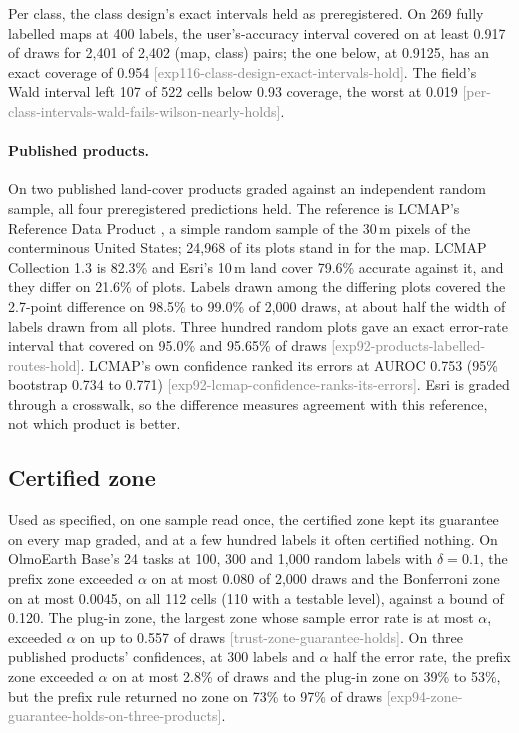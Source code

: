 \documentclass[11pt,a4paper]{article}
\newcommand{\claim}[1]{{\scriptsize\textsf{\textcolor{gray}{[#1]}}}}
\begin{document}
Per class, the class design's exact intervals held as preregistered. On 269 fully labelled maps at 400 labels, the
user's-accuracy interval covered on at least 0.917 of draws for 2,401 of 2,402 (map, class) pairs; the one below, at
0.9125, has an exact coverage of 0.954 \claim{exp116-class-design-exact-intervals-hold}. The field's Wald interval
left 107 of 522 cells below 0.93 coverage, the worst at 0.019
\claim{per-class-intervals-wald-fails-wilson-nearly-holds}.

\paragraph{Published products.}\label{sec:res-products}
On two published land-cover products graded against an independent random sample, all four preregistered predictions
held. The reference is LCMAP's Reference Data Product \citep{pengra2020}, a simple random sample of the 30\,m pixels
of the conterminous United States; 24,968 of its plots stand in for the map. LCMAP Collection 1.3 is 82.3\% and
Esri's 10\,m land cover 79.6\% accurate against it, and they differ on 21.6\% of plots. Labels drawn among the
differing plots covered the 2.7-point difference on 98.5\% to 99.0\% of 2,000 draws, at about half the width of
labels drawn from all plots. Three hundred random plots gave an exact error-rate interval that covered on 95.0\% and
95.65\% of draws \claim{exp92-products-labelled-routes-hold}. LCMAP's own confidence ranked its errors at AUROC 0.753
(95\% bootstrap 0.734 to 0.771) \claim{exp92-lcmap-confidence-ranks-its-errors}. Esri is graded through a crosswalk,
so the difference measures agreement with this reference, not which product is better.

\subsection{Certified zone}
\label{sec:zone-results}

Used as specified, on one sample read once, the certified zone kept its guarantee on every map graded, and at a few
hundred labels it often certified nothing. On OlmoEarth Base's 24 tasks at 100, 300 and 1,000 random labels with
$\delta = 0.1$, the prefix zone exceeded $\alpha$ on at most 0.080 of 2,000 draws and the Bonferroni zone on at most
0.0045, on all 112 cells (110 with a testable level), against a bound of 0.120. The plug-in zone, the largest zone
whose sample error rate is at most $\alpha$, exceeded $\alpha$ on up to 0.557 of draws
\claim{trust-zone-guarantee-holds}. On three published products' confidences, at 300 labels and $\alpha$ half the
error rate, the prefix zone exceeded $\alpha$ on at most 2.8\% of draws and the plug-in zone on 39\% to 53\%, but
the prefix rule returned no zone on 73\% to 97\% of draws \claim{exp94-zone-guarantee-holds-on-three-products}.
\end{document}
